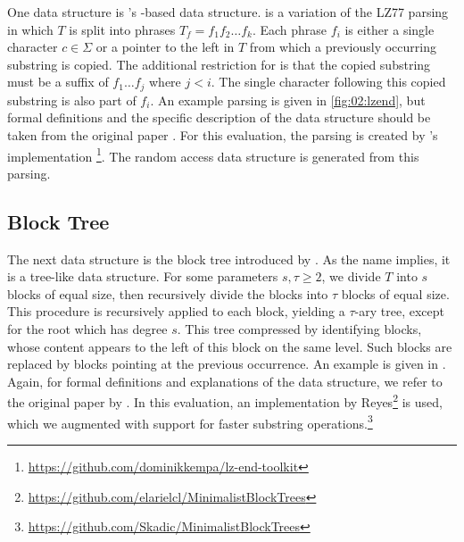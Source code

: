 \documentclass{scrartcl}
\begin{document}
One data structure is \citeauthor{kreft_self-index_2011}'s \lzend{}-based data structure.
\lzend{} is a variation of the LZ77 parsing \cite{ziv_universal_1977} in which $T$ is split into phrases $T_f = f_1 f_2 \dots f_k$.
Each phrase $f_i$ is either a single character $c \in \Sigma$ or a pointer to the left in $T$ from which a previously occurring substring is copied. The additional restriction for \lzend{} is that the copied substring must be a suffix of $f_1 \dots f_j$ where $j < i$.
The single character following this copied substring is also part of $f_i$.
An example parsing is given in \cref{fig:02:lzend}, but formal definitions and the specific description of the data structure should be taken from the original paper \cite{kreft_self-index_2011}.
For this evaluation, the parsing is created by \citeauthor{kempa_lz-end_2017}'s implementation \cite{kempa_lz-end_2017}\footnote{\url{https://github.com/dominikkempa/lz-end-toolkit}}.
The random access data structure is generated from this parsing.

\subsection{Block Tree}

The next data structure is the block tree introduced by \citeauthor{belazzougui_block_2021} \cite{belazzougui_block_2021}.
As the name implies, it is a tree-like data structure.
For some parameters $s, \tau \geq 2$, we divide $T$ into $s$ blocks of equal size, then recursively divide the blocks into $\tau$ blocks of equal size.
This procedure is recursively applied to each block, yielding a $\tau$-ary tree, except for the root which has degree $s$.
This tree compressed by identifying blocks, whose content appears to the left of this block on the same level.
Such blocks are replaced by blocks pointing at the previous occurrence.
An example is given in .
Again, for formal definitions and explanations of the data structure, we refer to the original paper by \citeauthor{belazzougui_block_2021} \cite{belazzougui_block_2021}.
In this evaluation, an implementation by Reyes\footnote{\url{https://github.com/elarielcl/MinimalistBlockTrees}} is used, which we augmented with support for faster substring operations.\footnote{\url{https://github.com/Skadic/MinimalistBlockTrees}}
\end{document}
